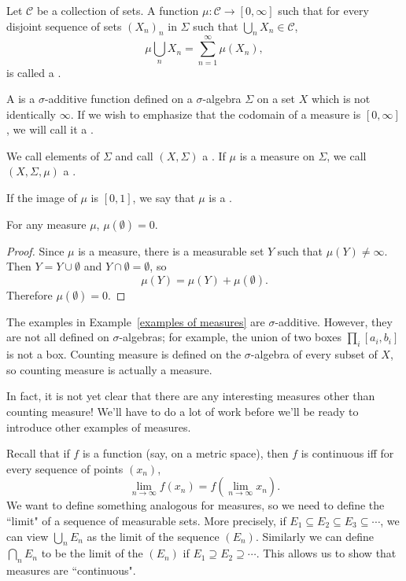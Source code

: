 \begin{definition}
Let $\mathcal C$ be a collection of sets.
A function $\mu: \mathcal C \to [0, \infty]$ such that for every disjoint sequence of sets ${(X_{n})}_{n}$ in $\Sigma$ such that $\bigcup_{n} X_{n} \in \mathcal C$,
\[\mu\bigcup_{n} X_{n} = \sum_{n=1}^{\infty} \mu(X_{n}),\]
is called a .
\end{definition}

\begin{definition}
A  is a $\sigma$-additive function defined on a $\sigma$-algebra $\Sigma$ on a set $X$ which is not identically $\infty$.
If we wish to emphasize that the codomain of a measure is $[0, \infty]$, we will call it a .

We call elements of $\Sigma$  and call $(X, \Sigma)$ a .
If $\mu$ is a measure on $\Sigma$, we call $(X, \Sigma, \mu)$ a .

If the image of $\mu$ is $[0, 1]$, we say that $\mu$ is a .
\end{definition}

\begin{lemma}\label{empty set is null}
For any measure $\mu$, $\mu(\emptyset) = 0$.
\end{lemma}
\begin{proof}
Since $\mu$ is a measure, there is a measurable set $Y$ such that $\mu(Y) \neq \infty$.
Then $Y = Y \cup \emptyset$ and $Y \cap \emptyset = \emptyset$, so
\[\mu(Y) = \mu(Y) + \mu(\emptyset).\]
Therefore $\mu(\emptyset) = 0$.
\end{proof}

\begin{example}
The examples in Example~\ref{examples of measures} are $\sigma$-additive.
However, they are not all defined on $\sigma$-algebras; for example, the union of two boxes $\prod_{i} [a_i, b_i]$ is not a box.
Counting measure is defined on the $\sigma$-algebra of every subset of $X$, so counting measure is actually a measure.

In fact, it is not yet clear that there are any interesting measures other than counting measure!
We'll have to do a lot of work before we'll be ready to introduce other examples of measures.
\end{example}

\begin{subsec}
Recall that if $f$ is a function (say, on a metric space), then $f$ is continuous iff for every sequence of points $(x_n)$,
$$\lim_{n \to \infty} f(x_n) = f\left(\lim_{n \to \infty} x_n\right).$$
We want to define something analogous for measures, so we need to define the ``limit" of a sequence of measurable sets.
More precisely, if $E_1 \subseteq E_2 \subseteq E_3 \subseteq \cdots$, we can view $\bigcup_n E_n$ as the limit of the sequence $(E_n)$.
Similarly we can define $\bigcap_n E_n$ to be the limit of the $(E_n)$ if $E_1 \supseteq E_2 \supseteq \cdots$.
This allows us to show that measures are ``continuous".
\end{subsec}

